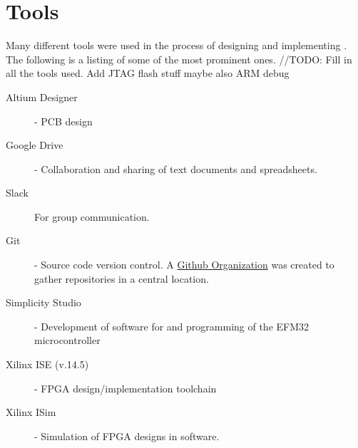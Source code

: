 \chapter{Tools}

Many different tools were used in the process of designing and implementing \vthreek.
The following is a listing of some of the most prominent ones.
//TODO: Fill in all the tools used. Add JTAG flash stuff maybe also ARM debug

\begin{description}
    \item[Altium Designer] - PCB design
    \item[Google Drive] - Collaboration and sharing of text documents and spreadsheets.
    \item[Slack] For group communication.
    \item[Git] - Source code version control. A \href{https://github.com/DMPRO-2015-vector-graphics}{Github Organization} was created to gather repositories in a central location.
    \item[Simplicity Studio] - Development of software for and programming of the EFM32 microcontroller
    \item[Xilinx ISE (v.14.5)] - FPGA design/implementation toolchain
    \item[Xilinx ISim] - Simulation of FPGA designs in software.
\end{description}
